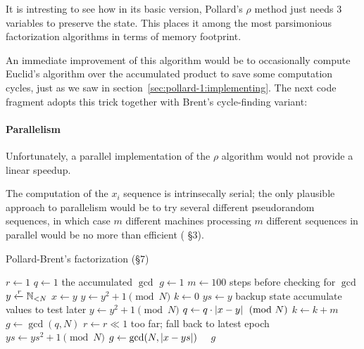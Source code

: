 \begin{remark}
  It is intresting to see how in its basic version, Pollard's $\rho$
  method just needs 3 variables  to preserve the
  state. This places it among the most parsimonious factorization algorithms in
  terms of memory footprint.
\end{remark}

An immediate improvement of this algorithm would be to occasionally compute Euclid's
algorithm over the accumulated product to save some computation cycles, just as
we saw in section~\ref{sec:pollard-1:implementing}. The next code fragment
adopts this trick together with Brent's cycle-finding variant:

\paragraph{Parallelism}
Unfortunately, a parallel implementation of the $\rho$ algorithm would not
provide a linear speedup.

The computation of the $x_i$ sequence is intrinsecally serial; the only
plausible approach to parallelism would be to try several different pseudorandom
sequences, in which case $m$ different machines processing $m$ different
sequences in parallel would be no more than 
efficient (\cite{brent:parallel} \S 3).

\begin{algorithm}
  \caption{Pollard-Brent's factorization (\cite{pollard-brent}\S 7)
    \label{alg:pollardrho}}
  \begin{algorithmic}[1]
    \State $r \gets 1$
    \State $q \gets 1$
    \Comment the accumulated $\gcd$
    \State $g \gets 1$
    \State $m \gets 100$
    \Comment steps before checking for $\gcd$
    \State $y \xleftarrow{r} \mathbb{N}_{< N}$
      \State $x \gets y$
        \State $y \gets y^2 + 1 \pmod{N}$
      \EndFor
      \State $k \gets 0$
        \State $ys \gets y$
        \Comment backup state
        \Comment accumulate values to test later
          \State $y \gets y^2 + 1 \pmod{N}$
          \State $q \gets q \cdot \left|x -y\right| \pmod{N}$
        \EndFor
        \State $k \gets k + m$
        \State $g \gets \gcd(q, N)$
      \EndWhile
      \State $r \gets r \ll 1$
    \EndWhile
     \Repeat
    \Comment too far; fall back to latest epoch
      \State $ys \gets ys^2 + 1 \pmod{N}$
      \State $g \gets \gcd(N, \left|x -ys\right|)$
     \EndIf
     \Return {}
    \Else \ \ \Return $g$
    \EndIf
    \EndFunction
  \end{algorithmic}
\end{algorithm}

